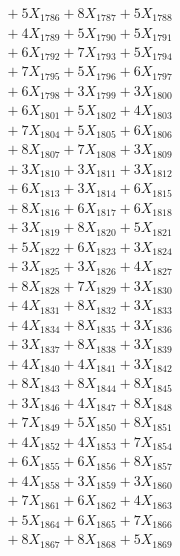 \documentclass[a4paper,10pt]{article}
\begin{document}
{\begin{align}
&\;  + 5 X_{1786} + 8 X_{1787} + 5 X_{1788} \\[0.3ex]
&\;  + 4 X_{1789} + 5 X_{1790} + 5 X_{1791} \\[0.3ex]
&\;  + 6 X_{1792} + 7 X_{1793} + 5 X_{1794} \\[0.3ex]
&\;  + 7 X_{1795} + 5 X_{1796} + 6 X_{1797} \\[0.3ex]
&\;  + 6 X_{1798} + 3 X_{1799} + 3 X_{1800} \\[0.3ex]
&\;  + 6 X_{1801} + 5 X_{1802} + 4 X_{1803} \\[0.3ex]
&\;  + 7 X_{1804} + 5 X_{1805} + 6 X_{1806} \\[0.3ex]
&\;  + 8 X_{1807} + 7 X_{1808} + 3 X_{1809} \\[0.5ex]\allowbreak
&\;  + 3 X_{1810} + 3 X_{1811} + 3 X_{1812} \\[0.3ex]
&\;  + 6 X_{1813} + 3 X_{1814} + 6 X_{1815} \\[0.3ex]
&\;  + 8 X_{1816} + 6 X_{1817} + 6 X_{1818} \\[0.3ex]
&\;  + 3 X_{1819} + 8 X_{1820} + 5 X_{1821} \\[0.3ex]
&\;  + 5 X_{1822} + 6 X_{1823} + 3 X_{1824} \\[0.3ex]
&\;  + 3 X_{1825} + 3 X_{1826} + 4 X_{1827} \\[0.3ex]
&\;  + 8 X_{1828} + 7 X_{1829} + 3 X_{1830} \\[0.3ex]
&\;  + 4 X_{1831} + 8 X_{1832} + 3 X_{1833} \\[0.3ex]
&\;  + 4 X_{1834} + 8 X_{1835} + 3 X_{1836} \\[0.3ex]
&\;  + 3 X_{1837} + 8 X_{1838} + 3 X_{1839} \\[0.5ex]\allowbreak
&\;  + 4 X_{1840} + 4 X_{1841} + 3 X_{1842} \\[0.3ex]
&\;  + 8 X_{1843} + 8 X_{1844} + 8 X_{1845} \\[0.3ex]
&\;  + 3 X_{1846} + 4 X_{1847} + 8 X_{1848} \\[0.3ex]
&\;  + 7 X_{1849} + 5 X_{1850} + 8 X_{1851} \\[0.3ex]
&\;  + 4 X_{1852} + 4 X_{1853} + 7 X_{1854} \\[0.3ex]
&\;  + 6 X_{1855} + 6 X_{1856} + 8 X_{1857} \\[0.3ex]
&\;  + 4 X_{1858} + 3 X_{1859} + 3 X_{1860} \\[0.3ex]
&\;  + 7 X_{1861} + 6 X_{1862} + 4 X_{1863} \\[0.3ex]
&\;  + 5 X_{1864} + 6 X_{1865} + 7 X_{1866} \\[0.3ex]
&\;  + 8 X_{1867} + 8 X_{1868} + 5 X_{1869} \\[0.5ex]\allowbreak

\end{align}}
\end{document}

